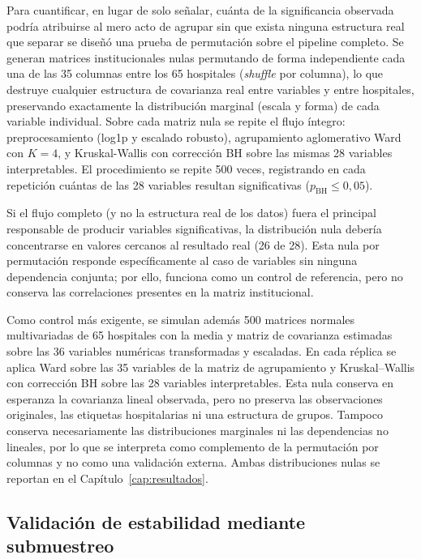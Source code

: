 Para cuantificar, en lugar de solo señalar, cuánta de la significancia
observada podría atribuirse al mero acto de agrupar sin que exista ninguna
estructura real que separar se diseñó una prueba de permutación sobre el
pipeline completo. Se generan matrices institucionales nulas permutando de
forma independiente cada una de las 35 columnas entre los 65 hospitales
(\textit{shuffle} por columna), lo que destruye cualquier estructura de
covarianza real entre variables y entre hospitales, preservando exactamente
la distribución marginal (escala y forma) de cada variable individual. Sobre
cada matriz nula se repite el flujo íntegro: preprocesamiento (log1p y
escalado robusto), agrupamiento aglomerativo Ward con $K=4$, y Kruskal-Wallis
con corrección BH sobre las mismas 28 variables interpretables. El
procedimiento se repite 500 veces, registrando en cada repetición cuántas de
las 28 variables resultan significativas ($p_{\text{BH}} \leq 0{,}05$).

Si el flujo completo (y no la estructura real de los datos) fuera el
principal responsable de producir variables significativas, la distribución
nula debería concentrarse en valores cercanos al resultado real (26 de 28).
Esta nula por permutación responde específicamente al caso de variables sin
ninguna dependencia conjunta; por ello, funciona como un control de referencia,
pero no conserva las correlaciones presentes en la matriz institucional.

Como control más exigente, se simulan además 500 matrices normales
multivariadas de 65 hospitales con la media y matriz de covarianza estimadas
sobre las 36 variables numéricas transformadas y escaladas. En cada réplica se
aplica Ward sobre las 35 variables de la matriz de agrupamiento y
Kruskal--Wallis con corrección BH sobre las 28 variables interpretables. Esta
nula conserva en esperanza la covarianza lineal observada, pero no preserva las
observaciones originales, las etiquetas hospitalarias ni una estructura de
grupos. Tampoco conserva necesariamente las distribuciones marginales ni las
dependencias no lineales, por lo que se interpreta como complemento de la
permutación por columnas y no como una validación externa. Ambas distribuciones
nulas se reportan en el Capítulo~\ref{cap:resultados}.


\subsection{Validación de estabilidad mediante submuestreo}
\label{sec:bootstrap}


